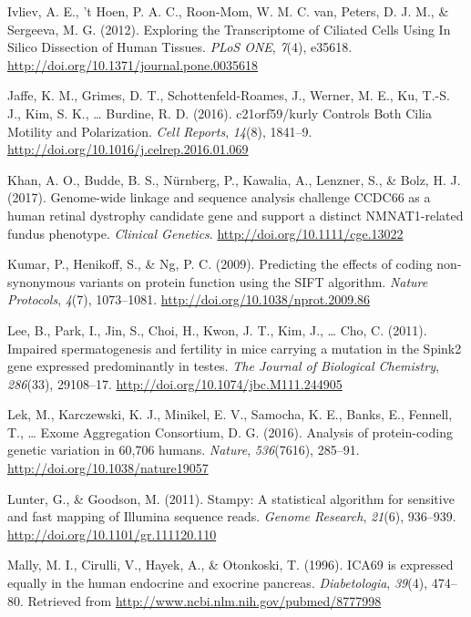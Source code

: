 \documentclass[12pt,twoside]{reedthesis}
\theoremstyle{definition}
\theoremstyle{definition}
\theoremstyle{remark}
\begin{document}
  \hypertarget{ref-Ivliev2012}{}
  Ivliev, A. E., 't Hoen, P. A. C., Roon-Mom, W. M. C. van, Peters, D. J.
  M., \& Sergeeva, M. G. (2012). Exploring the Transcriptome of Ciliated
  Cells Using In Silico Dissection of Human Tissues. \emph{PLoS ONE},
  \emph{7}(4), e35618. \url{http://doi.org/10.1371/journal.pone.0035618}
  
  \hypertarget{ref-Jaffe2016}{}
  Jaffe, K. M., Grimes, D. T., Schottenfeld-Roames, J., Werner, M. E., Ku,
  T.-S. J., Kim, S. K., \ldots{} Burdine, R. D. (2016). c21orf59/kurly
  Controls Both Cilia Motility and Polarization. \emph{Cell Reports},
  \emph{14}(8), 1841--9. \url{http://doi.org/10.1016/j.celrep.2016.01.069}
  
  \hypertarget{ref-Khan2017}{}
  Khan, A. O., Budde, B. S., Nürnberg, P., Kawalia, A., Lenzner, S., \&
  Bolz, H. J. (2017). Genome-wide linkage and sequence analysis challenge
  CCDC66 as a human retinal dystrophy candidate gene and support a
  distinct NMNAT1-related fundus phenotype. \emph{Clinical Genetics}.
  \url{http://doi.org/10.1111/cge.13022}
  
  \hypertarget{ref-Kumar2009}{}
  Kumar, P., Henikoff, S., \& Ng, P. C. (2009). Predicting the effects of
  coding non-synonymous variants on protein function using the SIFT
  algorithm. \emph{Nature Protocols}, \emph{4}(7), 1073--1081.
  \url{http://doi.org/10.1038/nprot.2009.86}
  
  \hypertarget{ref-Lee2011}{}
  Lee, B., Park, I., Jin, S., Choi, H., Kwon, J. T., Kim, J., \ldots{}
  Cho, C. (2011). Impaired spermatogenesis and fertility in mice carrying
  a mutation in the Spink2 gene expressed predominantly in testes.
  \emph{The Journal of Biological Chemistry}, \emph{286}(33), 29108--17.
  \url{http://doi.org/10.1074/jbc.M111.244905}
  
  \hypertarget{ref-Lek2016}{}
  Lek, M., Karczewski, K. J., Minikel, E. V., Samocha, K. E., Banks, E.,
  Fennell, T., \ldots{} Exome Aggregation Consortium, D. G. (2016).
  Analysis of protein-coding genetic variation in 60,706 humans.
  \emph{Nature}, \emph{536}(7616), 285--91.
  \url{http://doi.org/10.1038/nature19057}
  
  \hypertarget{ref-Lunter2011}{}
  Lunter, G., \& Goodson, M. (2011). Stampy: A statistical algorithm for
  sensitive and fast mapping of Illumina sequence reads. \emph{Genome
  Research}, \emph{21}(6), 936--939.
  \url{http://doi.org/10.1101/gr.111120.110}
  
  \hypertarget{ref-Mally1996}{}
  Mally, M. I., Cirulli, V., Hayek, A., \& Otonkoski, T. (1996). ICA69 is
  expressed equally in the human endocrine and exocrine pancreas.
  \emph{Diabetologia}, \emph{39}(4), 474--80. Retrieved from
  \url{http://www.ncbi.nlm.nih.gov/pubmed/8777998}
  
\end{document}
